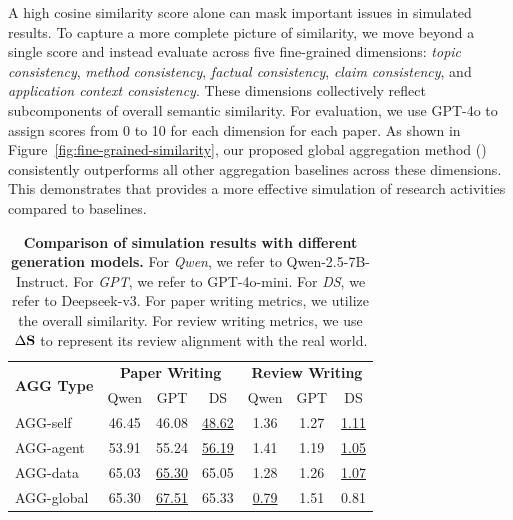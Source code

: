  A high cosine similarity score alone can mask important issues in simulated results.
To capture a more complete picture of similarity, we move beyond a single score and instead evaluate across five fine-grained dimensions: \textit{topic consistency}, \textit{method consistency}, \textit{factual consistency}, \textit{claim consistency}, and \textit{application context consistency}. These dimensions collectively reflect subcomponents of overall semantic similarity. For evaluation, we use GPT-4o to assign scores from 0 to 10 for each dimension for each paper. As shown in Figure~\ref{fig:fine-grained-similarity}, our proposed global aggregation method (\envname) consistently outperforms all other aggregation baselines across these dimensions. This demonstrates that \envname provides a more effective simulation of research activities compared to baselines. 


\begin{table}[t]
\setlength\tabcolsep{5pt}
\centering
\small
\caption{\textbf{Comparison of simulation results with different generation models.} For \textit{Qwen}, we refer to Qwen-2.5-7B-Instruct. For \textit{GPT}, we refer to GPT-4o-mini. For \textit{DS}, we refer to Deepseek-v3. For paper writing metrics, we utilize the overall similarity. For review writing metrics, we use $\Delta\mathbf{S}$ to represent its review alignment with the real world.}
\begin{tabular}{lcccccc}
\toprule
\multirow{2}{*}{\textbf{AGG Type}} & \multicolumn{3}{c}{\textbf{Paper Writing}} & \multicolumn{3}{c}{\textbf{Review Writing}} \\
\cmidrule(lr){2-4} \cmidrule(lr){5-7}
 & Qwen & GPT & DS & Qwen & GPT & DS \\
\midrule
AGG-self       & 46.45 & 46.08 & \underline{48.62} & 1.36 & 1.27 & \underline{1.11} \\
AGG-agent      & 53.91 & 55.24 & \underline{56.19} & 1.41 & 1.19 & \underline{1.05} \\
AGG-data       & 65.03 & \underline{65.30} & 65.05 & 1.28 & 1.26 & \underline{1.07} \\
AGG-global     & 65.30 & \underline{67.51} & 65.33 & \underline{0.79} & 1.51 & 0.81 \\
\bottomrule
\end{tabular}
\vspace{-4mm}
\label{tab:model-ablation}
\end{table}



